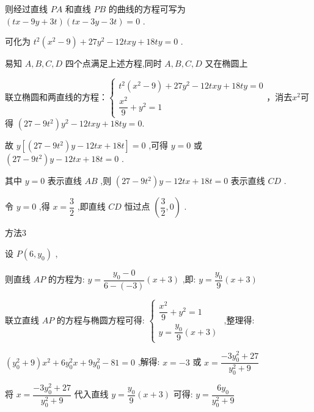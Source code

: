 \begin{enumerate}
\begin{jieda}
\begin{enumerate}
                则经过直线 ${PA}$ 和直线 ${PB}$ 的曲线的方程可写为 $\left( {{tx} - {9y} + {3t}}\right) \left( {{tx} - {3y} - {3t}}\right)  = 0$ .
                
                可化为 ${t}^{2}\left( {{x}^{2} - 9}\right)  + {27}{y}^{2} - {12txy} + {18ty} = 0$ .
                
                易知 $A,B,C,D$ 四个点满足上述方程,同时 $A,B,C,D$ 又在椭圆上
                
                联立椭圆和两直线的方程：$\left\{\begin{array}{l}
                     {t}^{2}\left( {{x}^{2} - 9}\right)  + {27}{y}^{2} - {12txy} + {18ty} = 0  \\
                     \dfrac{{x}^{2}}{9} + {y}^{2} = 1 
                \end{array}\right.$，消去$x^2$可得 $\left( {{27} - 9{t}^{2}}\right) {y}^{2} - {12txy} + {18ty} = 0$.
                
                故 $y\left\lbrack  {\left( {{27} - 9{t}^{2}}\right) y - {12tx} + {18t}}\right\rbrack   = 0$ ,可得 $y = 0$ 或 $\left( {{27} - 9{t}^{2}}\right) y - {12tx} + {18t} = 0$ .
                
                其中 $y = 0$ 表示直线 ${AB}$ ,则 $\left( {{27} - 9{t}^{2}}\right) y - {12tx} + {18t} = 0$ 表示直线 ${CD}$ .
                
                令 $y = 0$ ,得 $x = \dfrac{3}{2}$ ,即直线 ${CD}$ 恒过点 $\left( {\dfrac{3}{2},0}\right)$ .
         
            方法3
    
            设 $P\left( {6,{y}_{0}}\right)$ ,
            
            则直线 ${AP}$ 的方程为: $y = \dfrac{{y}_{0} - 0}{6 - \left( {-3}\right) }\left( {x + 3}\right)$ ,即: $y = \dfrac{{y}_{0}}{9}\left( {x + 3}\right)$
            
            联立直线 ${AP}$ 的方程与椭圆方程可得: $\left\{  \begin{array}{l} \dfrac{{x}^{2}}{9} + {y}^{2} = 1 \\  y = \dfrac{{y}_{0}}{9}\left( {x + 3}\right)  \end{array}\right.$ ,整理得:
            
            $\left( {{y}_{0}^{2} + 9}\right) {x}^{2} + 6{y}_{0}^{2}x + 9{y}_{0}^{2} - {81} = 0$ ,解得: $x =  - 3$ 或 $x = \dfrac{-3{y}_{0}^{2} + {27}}{{y}_{0}^{2} + 9}$
            
            将 $x = \dfrac{-3{y}_{0}^{2} + {27}}{{y}_{0}^{2} + 9}$ 代入直线 $y = \dfrac{{y}_{0}}{9}\left( {x + 3}\right)$ 可得: $y = \dfrac{6{y}_{0}}{{y}_{0}^{2} + 9}$
            

\end{enumerate}
\end{jieda}
\end{enumerate}

